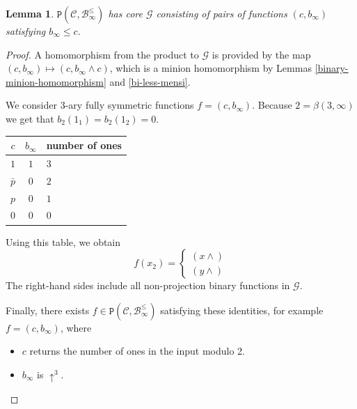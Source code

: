 \documentclass{amsart}
\numberwithin{equation}{section}
\theoremstyle{plain}
\newtheorem{lemma}[theorem]{Lemma}
\theoremstyle{definition}
\def\clone#1{\mathcal{#1}}
\def\minion#1{\mathcal{#1}}
\def\Bc{\clone{B}}
\def\Cc{\clone{C}}
\def\atleast#1{\uparrow^{#1}}
\def\C#1{{\mathtt{P}}(#1)}
\begin{document}
\begin{lemma}\label{cbleqinf} $\C{\Cc,\Bc_\infty^\leq}$ has core $\minion{G}$ consisting of pairs of functions $(c,b_\infty)$ satisfying $b_\infty \leq c$.
\end{lemma}
\begin{proof}
  A homomorphism from the product to $\minion{G}$ is provided by the map $(c,b_\infty) \mapsto (c,b_\infty \wedge c)$, which is a minion homomorphism by Lemmas \ref{binary-minion-homomorphism} and \ref{bi-less-mensi}. 

We consider $3$-ary fully symmetric functions $f= (c, b_\infty)$. 
Because $2 =  \beta(3,\infty)$ we get that $b_2(1_1) = b_2(1_2) = 0$. 

\begin{center}
\begin{tabular}{ |cc|l } 
 \hline
 $c$ & $b_\infty$ & number of ones \\ 
  \hline
     $1$ & $1$ & $3$ \\ 
     $\bar{p}$ & $0$ & $2$ \\ 
     $p$ & $0$ & $1$ \\ 
     $0$ & $0$ & $0$ \\ 
 \hline
\end{tabular}
\end{center}

Using this table, we obtain
$$f(x_2) = \left\{\begin{matrix}(x{\wedge}) \\ (y{\wedge})\end{matrix}\right.$$
The right-hand sides include all non-projection binary functions in $\minion{G}$.

Finally, there exists $f\in\C{\Cc,\Bc_\infty^\leq}$ satisfying these identities, for example $f=(c,b_\infty)$, where
\begin{itemize}
\item $c$ returns the number of ones in the input modulo 2.
\item $b_\infty$ is $\atleast{3}$.
\end{itemize}
\end{proof}
\end{document}
